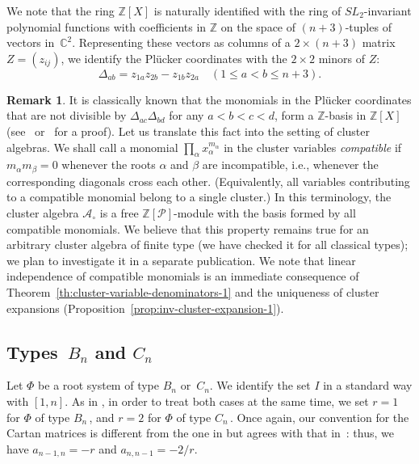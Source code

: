 \documentclass[letterpaper]{amsart}
\numberwithin{equation}{section}
\theoremstyle{definition}
\newtheorem{remark}[theorem]{Remark}
\def\AA{\mathcal{A}}
\def\ZZ{\mathbb{Z}}
\def\CC{\mathbb{C}}
\begin{document}
We note that the ring $\ZZ[X]$ is naturally identified 
with the ring of $SL_2$-invariant polynomial functions 
with coefficients in $\ZZ$ on the space of $(n+3)$-tuples of vectors in~$\CC^2$. 
Representing these vectors as columns of a $2 \times (n+3)$ 
matrix $Z = (z_{ij})$, we identify the Pl\"ucker coordinates with 
the $2 \times 2$ minors of $Z$: 
$$\Delta_{ab} = z_{1a} z_{2b} - z_{1b} z_{2a} \quad (1 \leq a < b \leq n+3).$$ 
 
\begin{remark} 
\label{rem:compatible-monomial-basis} 
It is classically known that the monomials in the Pl\"ucker coordinates 
that are not divisible by $\Delta_{ac} \Delta_{bd}$ for 
any $a < b < c <d$, form a $\ZZ$-basis in $\ZZ[X]$ 
(see~\cite{kungrota84} or~\cite{stur} for a proof). 
Let us translate this fact into the setting of cluster algebras. 
We shall call a monomial $\prod_\alpha x_\alpha^{m_\alpha}$ in the 
cluster variables \emph{compatible} if $m_\alpha m_\beta = 0$ 
whenever the roots $\alpha$ and $\beta$ are incompatible, i.e., 
whenever the corresponding diagonals cross each other. 
(Equivalently, all variables contributing to a compatible monomial 
belong to a single cluster.) 
In this terminology, the cluster algebra $\AA_\circ$ is a free 
$\ZZ[\mathcal P]$-module with the basis formed by all compatible monomials. 
We believe that this property remains true for an arbitrary cluster 
algebra of finite type (we have checked it for all classical 
types); we plan to investigate it in a separate publication. 
We note that linear independence of compatible monomials is an 
immediate consequence of Theorem~\ref{th:cluster-variable-denominators-1} 
and the uniqueness of cluster expansions 
(Proposition~\ref{prop:inv-cluster-expansion-1}). 
\end{remark} 
 
 
 
 
\subsection{Types~$B_n$ and $C_n$} 
\label{sec:ca-type-C} 
Let $\Phi$ be a root system of type $B_n$ or~$C_n$. 
We identify the set $I$ in a standard way with $[1,n]$. 
As in \cite[Section~4.2]{cfz}, in order to treat both cases at the same time, 
we set $r =1$ for 
$\Phi$ of type $B_n\,$, and $r = 2$ for 
$\Phi$ of type $C_n\,$. 
Once again, our convention for the Cartan matrices is different from 
the one in \cite{bourbaki} but agrees with that in~\cite{kac}: 
thus, we have $a_{n-1,n} = -r$ and $a_{n,n-1} = -2/r$. 
 
\end{document}
